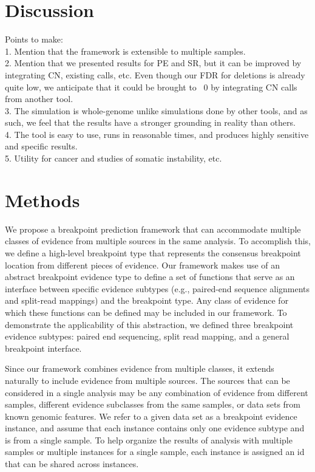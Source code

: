 \documentclass[11pt]{article}
\begin{document}
\section{Discussion}
Points to make:\\
1. Mention that the framework is extensible to multiple samples. \\
2. Mention that we presented results for PE and SR, but it can be 
improved by integrating CN, existing calls, etc.  Even though our FDR for 
deletions is already quite low, we anticipate that it could be brought to ~0
by integrating CN calls from another tool.\\
3. The simulation is whole-genome unlike simulations done by other tools, 
and as such, we feel that the results have a stronger grounding in reality
than others.\\
4. The tool is easy to use, runs in reasonable times, and produces highly
sensitive and specific results.\\
5. Utility for cancer and studies of somatic instability, etc.\\



\section{Methods}

We propose a breakpoint prediction framework that can accommodate multiple
classes of evidence from multiple sources in the same analysis.  To accomplish
this, we define a high-level breakpoint type that represents the consensus
breakpoint location from different pieces of evidence.  Our framework makes use
of an abstract breakpoint evidence type to define a set of functions that serve
as an interface between specific evidence subtypes (e.g., paired-end sequence
alignments and split-read mappings) and the breakpoint type.  Any class of
evidence for which these functions can be defined may be included in our
framework.  To demonstrate the applicability of this abstraction, we defined
three breakpoint evidence subtypes: paired end sequencing, split read mapping,
and a general breakpoint interface. 

Since our framework combines evidence from multiple classes, it extends
naturally to include evidence from multiple sources.  The sources that can be
considered in a single analysis may be any combination of evidence from
different samples, different evidence subclasses from the same samples, or
data sets from known genomic features.  We refer to a given data set as a
breakpoint evidence instance, and assume that each instance contains only one
evidence subtype and is from a single sample.  To help organize the results of
analysis with multiple samples or multiple instances for a single sample,
each instance is assigned an id that can be shared across instances.
\end{document}
